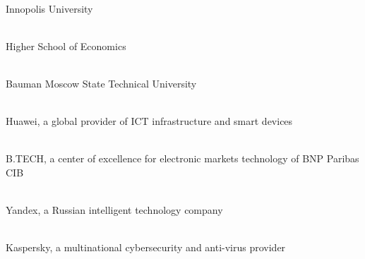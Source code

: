 
\cleardoublepage
{}

\newcommand\partner[3]{ \\ #3}

\partner{height=0.7in}{partners/iu}{Innopolis University}

\partner{height=0.8in}{partners/hse}{Higher School of Economics}

\partner{height=0.8in}{partners/bauman}{Bauman Moscow State Technical University}

\partner{height=0.5in}{partners/huawei}{Huawei, a global provider of ICT infrastructure and smart devices}

\partner{width=0.7in}{partners/bnp}{B.TECH, a center of excellence for electronic markets technology of BNP Paribas CIB}

\partner{width=1.2in}{partners/yandex}{Yandex, a Russian intelligent technology company}

\partner{width=2in}{partners/kaspersky}{Kaspersky, a multinational cybersecurity and anti-virus provider}
